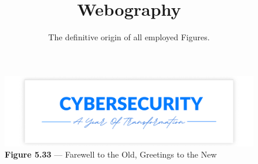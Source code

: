 \documentclass[letterpaper]{article}
\title{\textbf{Webography}}
\author{The definitive origin of all employed Figures.}
\begin{document}
    \maketitle
    

    \nocite{*}
        \setcounter{page}{141}

    

\begin{figure}[hbt!]
  \centering
  \includegraphics[width=14cm]{1-year.png}
  \caption*{\textbf{Figure 5.33} --- Farewell to the Old, Greetings to the New}
  \label{fig:secure-data}
\end{figure}
\FloatBarrier
\end{document}
